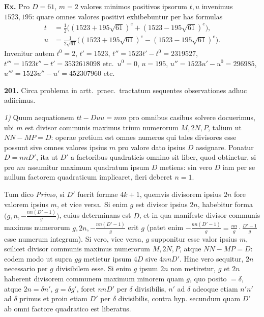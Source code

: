 \documentclass[12pt,a4paper]{article}
\theoremstyle{plain}
\theoremstyle{definition}
\theoremstyle{remark}
\begin{document}
\textbf{Ex.} Pro $D=61$, $m=2$ valores minimos positivos ipsorum $t,u$ invenimus $1523,195$: quare omnes valores positivi exhibebuntur per has formulas
\begin{align*}
t &= \tfrac{1}{2}\bigl((1523+195\sqrt{61})^e+(1523-195\sqrt{61})^e\bigr),\\
u &= \tfrac{1}{2\sqrt{61}}\bigl((1523+195\sqrt{61})^e-(1523-195\sqrt{61})^e\bigr).
\end{align*}
Invenitur autem $t^0=2$, $t'=1523$, $t''=1523t'-t^0=2319527$, $t'''=1523t''-t'=3532618098$ etc.\ $u^0=0$, $u=195$, $u''=1523u'-u^0=296985$, $u'''=1523u''-u'=452307960$ etc.

\textbf{201.}
Circa problema in artt.\ praec.\ tractatum sequentes observationes adhuc adiicimus.

\emph{1)} Quum aequationem $tt-Duu=mm$ pro omnibus casibus solvere docuerimus, ubi $m$ est divisor communis maximus trium numerorum $M,2N,P$, talium ut $NN-MP=D$: operae pretium est omnes numeros qui tales divisores esse possunt sive omnes valores ipsius $m$ pro valore dato ipsius $D$ assignare. Ponatur $D=nnD'$, ita ut $D'$ a factoribus quadraticis omnino sit liber, quod obtinetur, si pro $nn$ assumitur maximum quadratum ipsum $D$ metiens: sin vero $D$ iam per se nullum factorem quadraticum implicaret, fieri deberet $n=1$.

Tum dico \emph{Primo}, si $D'$ fuerit formae $4k+1$, quemvis divisorem ipsius $2n$ fore valorem ipsius $m$, et vice versa. Si enim $g$ est divisor ipsius $2n$, habebitur forma $\bigl(g,n,-\frac{nn(D'-1)}{g}\bigr)$, cuius determinans est $D$, et in qua manifeste divisor communis maximus numerorum $g,2n,-\frac{nn(D'-1)}{g}$ erit $g$ (patet enim $-\frac{nn(D'-1)}{g}=\frac{nn}{g}\cdot\frac{D'-1}{g}$ esse numerum integrum). Si vero, vice versa, $g$ supponitur esse valor ipsius $m$, scilicet divisor communis maximus numerorum $M,2N,P$, atque $NN-MP=D$: eodem modo ut supra $gg$ metietur ipsum $4D$ sive $4nnD'$. Hinc vero sequitur, $2n$ necessario per $g$ divisibilem esse. Si enim $g$ ipsum $2n$ non metiretur, $g$ et $2n$ haberent divisorem communem maximum minorem quam $g$, quo posito $=\delta$, atque $2n=\delta n'$, $g=\delta g'$, foret $nnD'$ per $\delta$ divisibilis, $n'$ ad $\delta$ adeoque etiam $n'n'$ ad $\delta$ primus et proin etiam $D'$ per $\delta$ divisibilis, contra hyp. secundum quam $D'$ ab omni factore quadratico est liberatus.
\end{document}
